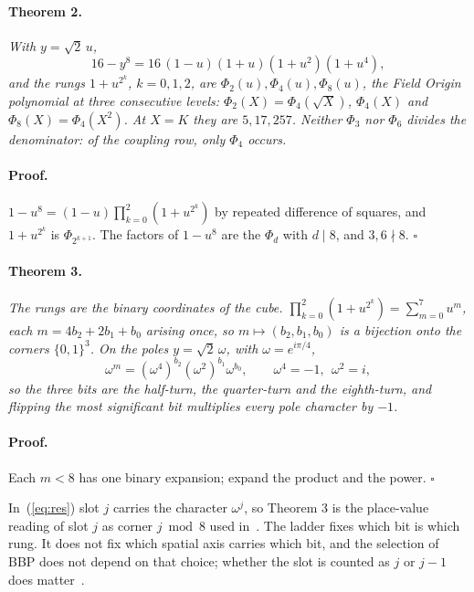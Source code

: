 \documentclass[twocolumn]{iopjournal}
\begin{document}
\paragraph{Theorem 2.} \textit{With $y = \sqrt2\,u$,}
\begin{equation}
  16 - y^8 = 16\,(1-u)(1+u)(1+u^2)(1+u^4),
\end{equation}
\textit{and the rungs $1 + u^{2^k}$, $k = 0, 1, 2$, are
$\Phi_2(u), \Phi_4(u), \Phi_8(u)$, the Field Origin polynomial at
three consecutive levels: $\Phi_2(X) = \Phi_4(\sqrt X)$, $\Phi_4(X)$
and $\Phi_8(X) = \Phi_4(X^2)$. At $X = K$ they are $5, 17, 257$.
Neither $\Phi_3$ nor $\Phi_6$ divides the denominator: of the
coupling row, only $\Phi_4$ occurs.}

\paragraph{Proof.} $1 - u^8 = (1 - u)\prod_{k=0}^{2}(1 + u^{2^k})$
by repeated difference of squares, and $1 + u^{2^k}$ is
$\Phi_{2^{k+1}}$. The factors of $1 - u^8$ are the $\Phi_d$ with
$d \mid 8$, and $3, 6 \nmid 8$. \hfill $\square$

\paragraph{Theorem 3.} \textit{The rungs are the binary coordinates
of the cube. $\prod_{k=0}^{2}(1 + u^{2^k}) = \sum_{m=0}^{7} u^m$,
each $m = 4b_2 + 2b_1 + b_0$ arising once, so $m \mapsto
(b_2, b_1, b_0)$ is a bijection onto the corners $\{0,1\}^3$. On the
poles $y = \sqrt2\,\omega$, with $\omega = e^{i\pi/4}$,}
\begin{equation}
  \omega^m = (\omega^4)^{b_2}(\omega^2)^{b_1}\omega^{b_0},\qquad
  \omega^4 = -1,\ \ \omega^2 = i,
\end{equation}
\textit{so the three bits are the half-turn, the quarter-turn and the
eighth-turn, and flipping the most significant bit multiplies every
pole character by $-1$.}

\paragraph{Proof.} Each $m < 8$ has one binary expansion; expand the
product and the power. \hfill $\square$

\medskip
\noindent
In~(\ref{eq:res}) slot $j$ carries the character $\omega^j$, so
Theorem 3 is the place-value reading of slot $j$ as corner
$j \bmod 8$ used in~\cite{Nelson2026bbp}. The ladder fixes which bit
is which rung. It does not fix which spatial axis carries which bit,
and the selection of BBP does not depend on that choice; whether the
slot is counted as $j$ or $j - 1$ does matter~\cite{Nelson2026bbp}.
\end{document}
